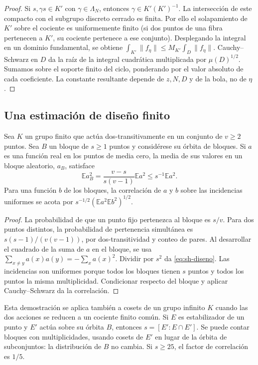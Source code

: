 \begin{proof}
Si $s,\gamma s\in K'$ con $\gamma\in\Lambda_N$, entonces $\gamma\in K'(K')^{-1}$. La intersección de este compacto con el subgrupo discreto cerrado es finita. Por ello el solapamiento de $K'$ sobre el cociente es uniformemente finito (si dos puntos de una fibra pertenecen a $K'$, su cociente pertenece a ese conjunto). Desplegando la integral en un dominio fundamental, se obtiene $\int_{K'}\|f_\eta\|\le M_{K'}\int_D\|f_\eta\|$. Cauchy--Schwarz en $D$ da la raíz de la integral cuadrática multiplicada por $\mu(D)^{1/2}$. Sumamos sobre el soporte finito del ciclo, ponderando por el valor absoluto de cada coeficiente. La constante resultante depende de $z,N,D$ y de la bola, no de $\eta$.
\end{proof}

\subsection{Una estimación de diseño finito}

\begin{lema}
\label{lem:sh-diseno}
Sea $K$ un grupo finito que actúa dos-transitivamente en un conjunto de $v\ge2$ puntos. Sea $B$ un bloque de $s\ge1$ puntos y considérese su órbita de bloques. Si $a$ es una función real en los puntos de media cero, la media de sus valores en un bloque aleatorio, $a_B$, satisface
\begin{equation}
 \mathbb E a_B^2=\frac{v-s}{s(v-1)}\mathbb E a^2
 \le s^{-1}\mathbb E a^2.
 \label{eq:sh-diseno}
\end{equation}
Para una función $b$ de los bloques, la correlación de $a$ y $b$ sobre las incidencias uniformes se acota por $s^{-1/2}(\mathbb E a^2\mathbb E b^2)^{1/2}$.
\end{lema}
\begin{proof}
La probabilidad de que un punto fijo pertenezca al bloque es $s/v$. Para dos puntos distintos, la probabilidad de pertenencia simultánea es $s(s-1)/(v(v-1))$, por dos-transitividad y conteo de pares. Al desarrollar el cuadrado de la suma de $a$ en el bloque, se usa $\sum_{x\ne y}a(x)a(y)=-\sum_x a(x)^2$. Dividir por $s^2$ da \eqref{eq:sh-diseno}. Las incidencias son uniformes porque todos los bloques tienen $s$ puntos y todos los puntos la misma multiplicidad. Condicionar respecto del bloque y aplicar Cauchy--Schwarz da la correlación.
\end{proof}

Esta demostración se aplica también a cosets de un grupo infinito $K$ cuando las dos acciones se reducen a un cociente finito común. Si $E$ es estabilizador de un punto y $E'$ actúa sobre su órbita $B$, entonces $s=[E':E\cap E']$. Se puede contar bloques con multiplicidades, usando cosets de $E'$ en lugar de la órbita de subconjuntos: la distribución de $B$ no cambia. Si $s\ge25$, el factor de correlación es $1/5$.

